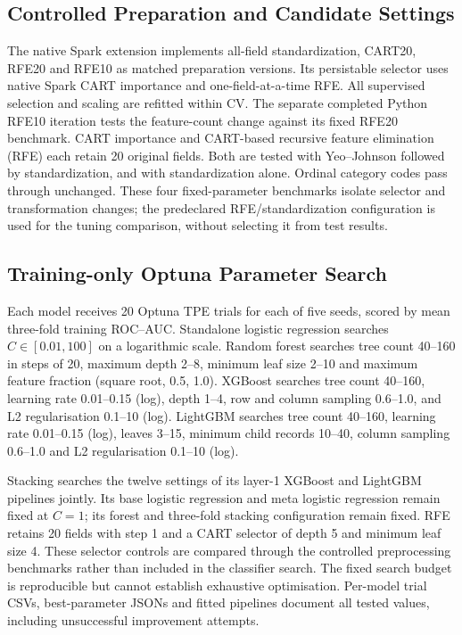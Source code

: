 \subsection{Controlled Preparation and Candidate Settings}
The native Spark extension implements all-field standardization, CART20, RFE20 and RFE10 as matched preparation versions. Its persistable selector uses native Spark CART importance and one-field-at-a-time RFE. All supervised selection and scaling are refitted within CV. The separate completed Python RFE10 iteration tests the feature-count change against its fixed RFE20 benchmark.
CART importance and CART-based recursive feature elimination (RFE) each retain 20 original fields. Both are tested with Yeo--Johnson followed by standardization, and with standardization alone. Ordinal category codes pass through unchanged. These four fixed-parameter benchmarks isolate selector and transformation changes; the predeclared RFE/standardization configuration is used for the tuning comparison, without selecting it from test results.

\subsection{Training-only Optuna Parameter Search}
Each model receives 20 Optuna TPE trials for each of five seeds, scored by mean three-fold training ROC--AUC. Standalone logistic regression searches $C\in[0.01,100]$ on a logarithmic scale. Random forest searches tree count 40--160 in steps of 20, maximum depth 2--8, minimum leaf size 2--10 and maximum feature fraction (square root, 0.5, 1.0). XGBoost searches tree count 40--160, learning rate 0.01--0.15 (log), depth 1--4, row and column sampling 0.6--1.0, and L2 regularisation 0.1--10 (log). LightGBM searches tree count 40--160, learning rate 0.01--0.15 (log), leaves 3--15, minimum child records 10--40, column sampling 0.6--1.0 and L2 regularisation 0.1--10 (log).

Stacking searches the twelve settings of its layer-1 XGBoost and LightGBM pipelines jointly. Its base logistic regression and meta logistic regression remain fixed at $C=1$; its forest and three-fold stacking configuration remain fixed. RFE retains 20 fields with step 1 and a CART selector of depth 5 and minimum leaf size 4. These selector controls are compared through the controlled preprocessing benchmarks rather than included in the classifier search. The fixed search budget is reproducible but cannot establish exhaustive optimisation. Per-model trial CSVs, best-parameter JSONs and fitted pipelines document all tested values, including unsuccessful improvement attempts.


